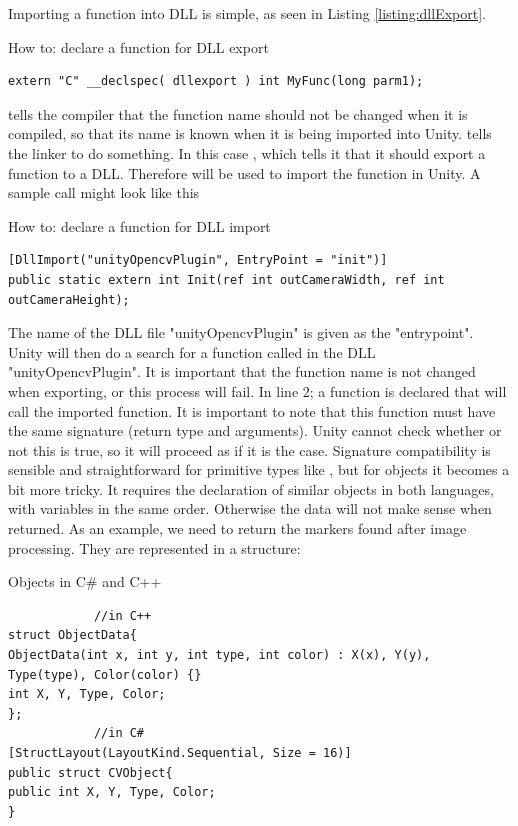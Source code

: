 		Importing a function into DLL is simple, as seen in Listing \ref{listing:dllExport}.
\begin{listing}[H]
\caption{How to: declare a function for DLL export}
\label{listing:dllExport}
\begin{verbatim}
extern "C" __declspec( dllexport ) int MyFunc(long parm1);
\end{verbatim}
\end{listing}
 tells the compiler that the function name should not be changed when it is compiled, so that its name is known when it is being imported into Unity.  tells the linker to do something. In this case , which tells it that it should export a function to a DLL. Therefore  will be used to import the function in Unity. A sample call might look like this\\
\begin{listing}[H]
	\caption{How to: declare a function for DLL import}
	\label{listing:dllImport}
	\begin{verbatim}
[DllImport("unityOpencvPlugin", EntryPoint = "init")]
public static extern int Init(ref int outCameraWidth, ref int outCameraHeight);
	\end{verbatim}
\end{listing}
The name of the DLL file "unityOpencvPlugin" is given as the "entrypoint". Unity will then do a search for a function called  in the DLL "unityOpencvPlugin". It is important that the function name is not changed when exporting, or this process will fail. In line 2; a function is declared that will call the imported function. It is important to note that this function must have the same signature (return type and arguments). Unity cannot check whether or not this is true, so it will proceed as if it is the case. Signature compatibility is sensible and straightforward for primitive types like , but for objects it becomes a bit more tricky. It requires the declaration of similar objects in both languages, with variables in the same order. Otherwise the data will not make sense when returned. As an example, we need to return the markers found after image processing. They are represented in a structure: 
\begin{listing}[H]
	\caption{Objects in C\# and C++}
	\label{listing:objects}
	\begin{verbatim}
			//in C++
struct ObjectData{
ObjectData(int x, int y, int type, int color) : X(x), Y(y), Type(type), Color(color) {}
int X, Y, Type, Color;
};
			//in C#	
[StructLayout(LayoutKind.Sequential, Size = 16)]
public struct CVObject{
public int X, Y, Type, Color;
}
	\end{verbatim}
\end{listing}
